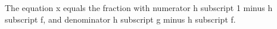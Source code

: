The equation x equals the fraction with numerator h subscript 1 minus h subscript f, and denominator h subscript g minus h subscript f.